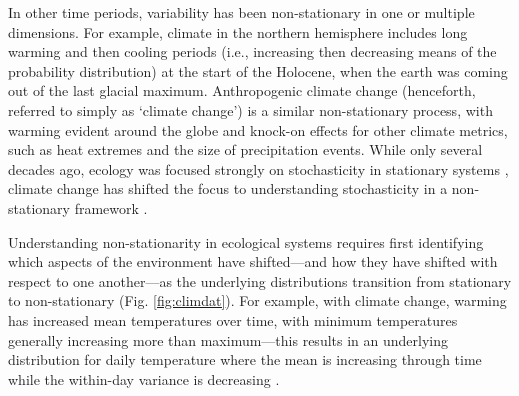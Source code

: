 \documentclass[11pt,letterpaper]{article}
\begin{document}
In other time periods, variability has been non-stationary in one or multiple dimensions. For example, climate in the northern hemisphere includes long warming and then cooling periods (i.e., increasing then decreasing means of the probability distribution) at the start of the Holocene, when the earth was coming out of the last glacial maximum. Anthropogenic climate change (henceforth, referred to simply as `climate change') is a similar non-stationary process, with warming evident around the globe and knock-on effects for other climate metrics, such as heat extremes and the size of precipitation events. While only several decades ago, ecology was focused strongly on stochasticity in stationary systems \citep[e.g.,][]{Ripa1996,Kaitala1997}, climate change has shifted the focus to understanding stochasticity in a non-stationary framework \citep[e.g.,][]{cazwavelets,ehrlen2016,legault2019}.

Understanding non-stationarity in ecological systems requires first identifying which aspects of the environment have shifted---and how they have shifted with respect to one another---as the underlying  distributions transition from stationary to non-stationary (Fig. \ref{fig:climdat}). For example, with climate change, warming has increased mean temperatures over time, with minimum temperatures generally increasing more than maximum---this results in an underlying distribution for daily temperature where the mean is increasing through time while the within-day variance is decreasing \citep{ipcc2013,screen2014}. 
\end{document}
